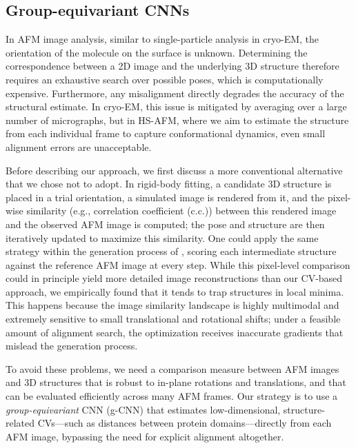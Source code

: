 \subsection{Group-equivariant CNNs}
\label{subsec:gcnn}

In AFM image analysis, similar to single-particle analysis in cryo-EM, the orientation of the molecule on the surface is unknown.
Determining the correspondence between a 2D image and the underlying 3D structure therefore requires an exhaustive search over possible poses, which is computationally expensive.
Furthermore, any misalignment directly degrades the accuracy of the structural estimate.
In cryo-EM, this issue is mitigated by averaging over a large number of micrographs, but in HS-AFM, where we aim to estimate the structure from each individual frame to capture conformational dynamics, even small alignment errors are unacceptable.

Before describing our approach, we first discuss a more conventional alternative that we chose not to adopt.
In rigid-body fitting, a candidate 3D structure is placed in a trial orientation, a simulated image is rendered from it, and the pixel-wise similarity (e.g., correlation coefficient (c.c.)) between this rendered image and the observed AFM image is computed; the pose and structure are then iteratively updated to maximize this similarity.
One could apply the same strategy within the generation process of \AFiii, scoring each intermediate structure against the reference AFM image at every step.
While this pixel-level comparison could in principle yield more detailed image reconstructions than our CV-based approach, we empirically found that it tends to trap structures in local minima.
This happens because the image similarity landscape is highly multimodal and extremely sensitive to small translational and rotational shifts; under a feasible amount of alignment search, the optimization receives inaccurate gradients that mislead the generation process.

To avoid these problems, we need a comparison measure between AFM images and 3D structures that is robust to in-plane rotations and translations, and that can be evaluated efficiently across many AFM frames.
Our strategy is to use a \emph{group-equivariant} CNN (g-CNN) \cite{CohenWelling2016_GCNN, CohenWelling2017_SteerableCNNs, e2cnn, WeilerEtAl2018_3DSteerableCNNs} that estimates low-dimensional, structure-related CVs---such as distances between protein domains---directly from each AFM image, bypassing the need for explicit alignment altogether.

